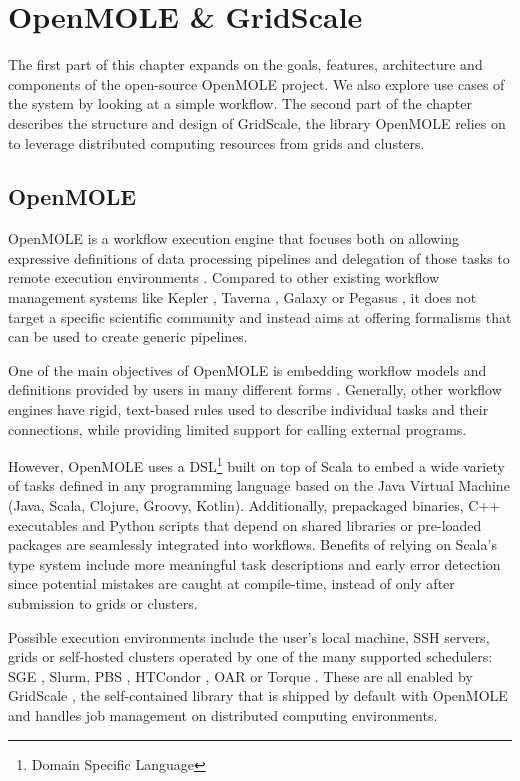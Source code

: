 \chapter{OpenMOLE \& GridScale} \label{DesignChapter}

The first part of this chapter expands on the goals, features, architecture and components of the open-source OpenMOLE project. We also explore use cases of the system by looking at a simple workflow. The second part of the chapter describes the structure and design of GridScale, the library OpenMOLE relies on to leverage distributed computing resources from grids and clusters.

\section{OpenMOLE}

OpenMOLE\cite{OpenMOLE} is a workflow execution engine that focuses both on allowing expressive definitions of data processing pipelines and delegation of those tasks to remote execution environments \cite{Leclaire2016}. Compared to other existing workflow management systems like Kepler \cite{Kepler}, Taverna \cite{Taverna}, Galaxy \cite{Galaxy} or Pegasus \cite{Pegasus}, it does not target a specific scientific community and instead aims at offering formalisms that can be used to create generic pipelines.

One of the main objectives of OpenMOLE is embedding workflow models and definitions provided by users in many different forms \cite{Reuillon2013}. Generally, other workflow engines have rigid, text-based rules used to describe individual tasks and their connections, while providing limited support for calling external programs. 

However, OpenMOLE uses a DSL\footnote{Domain Specific Language} built on top of Scala\cite{Scala} to embed a wide variety of tasks defined in any programming language based on the Java Virtual Machine (Java, Scala, Clojure, Groovy, Kotlin). Additionally, prepackaged binaries, C++ executables and Python scripts that depend on shared libraries or pre-loaded packages are seamlessly integrated into workflows. Benefits of relying on Scala's type system include more meaningful task descriptions and early error detection since potential mistakes are caught at compile-time, instead of only after submission to grids or clusters.

Possible execution environments include the user's local machine, SSH servers, grids or self-hosted clusters operated by one of the many supported schedulers: SGE \cite{SGE}, Slurm, \cite{SLURM} PBS \cite{PBS}, HTCondor \cite{HTCondor}, OAR \cite{OAR} or Torque \cite{Torque}. These are all enabled by GridScale \cite{Reuillon2016}, the self-contained library that is shipped by default with OpenMOLE and handles job management on distributed computing environments.

